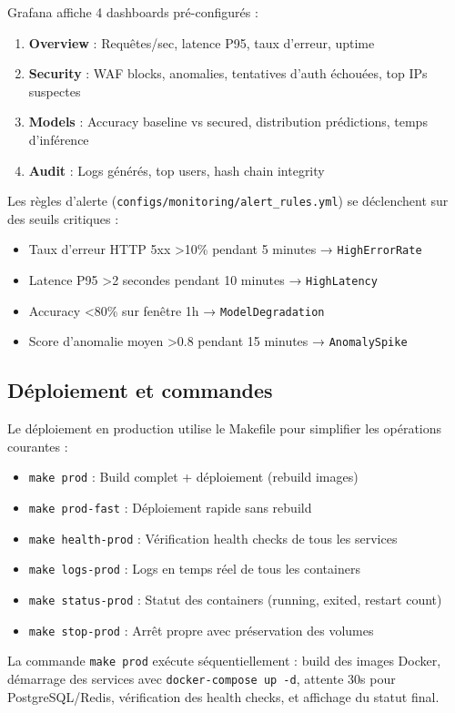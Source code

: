 Grafana affiche 4 dashboards pré-configurés :

\begin{enumerate}
    \item \textbf{Overview} : Requêtes/sec, latence P95, taux d'erreur, uptime
    \item \textbf{Security} : WAF blocks, anomalies, tentatives d'auth échouées, top IPs suspectes
    \item \textbf{Models} : Accuracy baseline vs secured, distribution prédictions, temps d'inférence
    \item \textbf{Audit} : Logs générés, top users, hash chain integrity
\end{enumerate}

Les règles d'alerte (\texttt{configs/monitoring/alert\_rules.yml}) se déclenchent sur des seuils critiques :

\begin{itemize}
    \item Taux d'erreur HTTP 5xx >10\% pendant 5 minutes → \texttt{HighErrorRate}
    \item Latence P95 >2 secondes pendant 10 minutes → \texttt{HighLatency}
    \item Accuracy <80\% sur fenêtre 1h → \texttt{ModelDegradation}
    \item Score d'anomalie moyen >0.8 pendant 15 minutes → \texttt{AnomalySpike}
\end{itemize}


\subsection{Déploiement et commandes}

Le déploiement en production utilise le Makefile pour simplifier les opérations courantes :

\begin{itemize}
    \item \texttt{make prod} : Build complet + déploiement (rebuild images)
    \item \texttt{make prod-fast} : Déploiement rapide sans rebuild
    \item \texttt{make health-prod} : Vérification health checks de tous les services
    \item \texttt{make logs-prod} : Logs en temps réel de tous les containers
    \item \texttt{make status-prod} : Statut des containers (running, exited, restart count)
    \item \texttt{make stop-prod} : Arrêt propre avec préservation des volumes
\end{itemize}

La commande \texttt{make prod} exécute séquentiellement : build des images Docker, démarrage des services avec \texttt{docker-compose up -d}, attente 30s pour PostgreSQL/Redis, vérification des health checks, et affichage du statut final.
